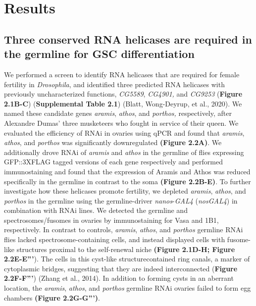 \documentclass[12pt,oneside]{reedthesis}
\begin{document}
\hypertarget{results}{%
\section{Results}\label{results}}

\hypertarget{three-conserved-rna-helicases-are-required-in-the-germline-for-gsc-differentiation}{%
\subsection{Three conserved RNA helicases are required in the germline for GSC differentiation}\label{three-conserved-rna-helicases-are-required-in-the-germline-for-gsc-differentiation}}

We performed a screen to identify RNA helicases that are required for
female fertility in \emph{Drosophila}, and identified three predicted RNA
helicases with previously uncharacterized functions, \emph{CG5589}, \emph{CG4901,}
and \emph{CG9253} (\textbf{Figure 2.1B-C}) (\textbf{Supplemental Table 2.1})
(Blatt, Wong-Deyrup, et al., 2020). We named these candidate genes
\emph{aramis}, \emph{athos}, and \emph{porthos,} respectively, after Alexandre Dumas'
three musketeers who fought in service of their queen. We evaluated the
efficiency of RNAi in ovaries using qPCR and found that \emph{aramis},
\emph{athos}, and \emph{porthos} was significantly downregulated \textbf{(Figure 2.2A)}.
We additionally drove RNAi of \emph{aramis} and \emph{athos} in the germline of
flies expressing GFP::3XFLAG tagged versions of each gene respectively
and performed immunostaining and found that the expression of Aramis and
Athos was reduced specifically in the germline in contrast to the soma
\textbf{(Figure 2.2B-E)}. To further investigate how these helicases promote
fertility, we depleted \emph{aramis}, \emph{athos}, and \emph{porthos} in the germline
using the germline-driver \emph{nanos}-\emph{GAL4} (\emph{nosGAL4}) in combination with
RNAi lines. We detected the germline and spectrosomes/fusomes in ovaries
by immunostaining for Vasa and 1B1, respectively. In contrast to
controls, \emph{aramis}, \emph{athos}, and \emph{porthos} germline RNAi flies lacked
spectrosome-containing cells, and instead displayed cells with
fusome-like structures proximal to the self-renewal niche \textbf{(Figure 2.1D-H; Figure 2.2E-E'''}).
The cells in this cyst-like structurecontained ring canals,
a marker of cytoplasmic bridges, suggesting that
they are indeed interconnected (\textbf{Figure 2.2F-F'''}) (Zhang et al., 2014).
In addition to forming cysts in an aberrant location, the \emph{aramis},
\emph{athos}, and \emph{porthos} germline RNAi ovaries failed to form egg chambers
\textbf{(Figure 2.2G-G''')}.
\end{document}
